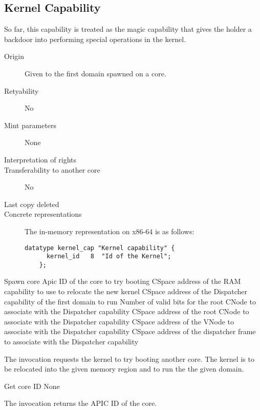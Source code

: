 \subsection{Kernel Capability}
So far, this capability is treated as the magic capability that gives
the holder a backdoor into performing special operations in the
kernel.

\begin{description}
\item[Origin] Given to the first domain spawned on a core.
  
\item[Retyability] No
  
\item[Mint parameters] None
  
\item[Interpretation of rights] 
  
\item[Transferability to another core] No

\item[Last copy deleted] 
  
\item[Concrete representations] The in-memory representation on x86-64 is as follows:
  
  \begin{lstlisting}[language=Mackerel]
    datatype kernel_cap "Kernel capability" {
      kernel_id   8  "Id of the Kernel";
    };
  \end{lstlisting}
\end{description}

\begin{invocation}{Spawn core}
  \arg Apic ID of the core to try booting
  \arg CSpace address of the RAM capability to use to relocate the new kernel
  \arg CSpace address of the Dispatcher capability of the first domain to run
  \arg Number of valid bits for the root CNode to associate with the Dispatcher capability
  \arg CSpace address of the root CNode to associate with the Dispatcher capability
  \arg CSpace address of the VNode to associate with the Dispatcher capability
  \arg CSpace address of the dispatcher frame to associate with the Dispatcher capability
\end{invocation}
The invocation requests the kernel to try booting another core.  The
kernel is to be relocated into the given memory region and to run the
the given domain.

\begin{invocation}{Get core ID}
  \arg None
\end{invocation}
The invocation returns the APIC ID of the core.


